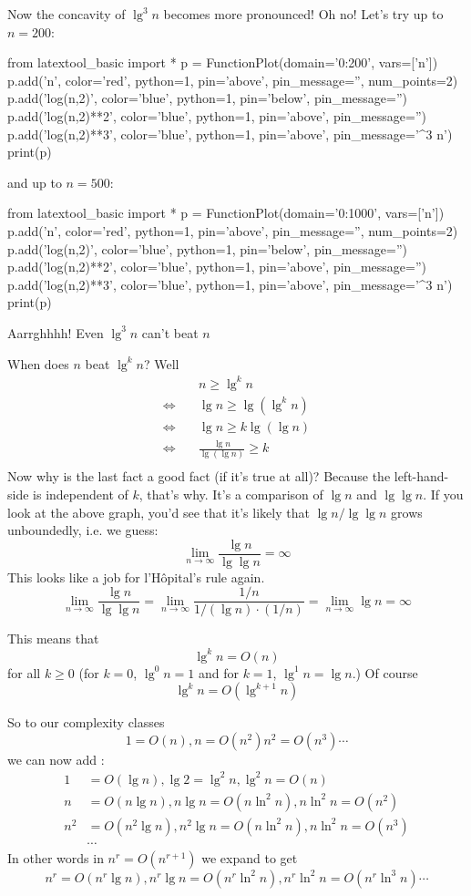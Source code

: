 Now the concavity of $\lg^3 n$ becomes more pronounced!
Oh no!
Let's try up to $n = 200$:
\begin{python}
from latextool_basic import *
p = FunctionPlot(domain='0:200', vars=['n'])
p.add('n', color='red', python=1, pin='above', pin_message='', num_points=2)
p.add('log(n,2)', color='blue', python=1, pin='below', pin_message='')
p.add('log(n,2)**2', color='blue', python=1, pin='above', pin_message='')
p.add('log(n,2)**3', color='blue', python=1, pin='above', pin_message='\lg^3 n')
print(p)
\end{python}
and up to $n = 500$:
\begin{python}
from latextool_basic import *
p = FunctionPlot(domain='0:1000', vars=['n'])
p.add('n', color='red', python=1, pin='above', pin_message='', num_points=2)
p.add('log(n,2)', color='blue', python=1, pin='below', pin_message='')
p.add('log(n,2)**2', color='blue', python=1, pin='above', pin_message='')
p.add('log(n,2)**3', color='blue', python=1, pin='above', pin_message='\lg^3 n')
print(p)
\end{python}
Aarrghhhh! Even $\lg^3 n$ can't beat $n$

When does $n$ beat $\lg^k n$?
Well
\begin{align*}
                 & n \geq \lg^k n \\
\iff \,\,\,\,\,\,& \lg n \geq \lg(\lg^k n) \\
\iff \,\,\,\,\,\,& \lg n \geq k \lg(\lg n) \\
\iff \,\,\,\,\,\,& \frac{\lg n}{\lg(\lg n)} \geq k \\
\end{align*}
Now why is the last fact a good fact (if it's true at all)?
Because the left-hand-side is independent of $k$, that's why.
It's a comparison of $\lg n$ and $\lg\lg n$.
If you look at the above graph, you'd see that it's likely that 
$\lg n/\lg\lg n$ grows unboundedly, i.e. we guess:
\[
\lim_{n \rightarrow \infty} \frac{\lg n}{\lg \lg n} = \infty
\]
This looks like a job for l'H\^opital's rule again.
\[
\lim_{n \rightarrow \infty} \frac{\lg n}{\lg \lg n}
= \lim_{n \rightarrow \infty} \frac{1/n}{1/(\lg n) \cdot (1/n)}
= \lim_{n \rightarrow \infty} \lg n
= \infty
\]

This means that 
\[
\lg^k n = O(n)
\]
for all $k \geq 0$
(for $k = 0$, $\lg^0 n = 1$ and for $k = 1$, $\lg^1 n = \lg n$.)
Of course
\[
\lg^k n = O(\lg^{k+1} n)
\]

So to our complexity classes
\[
1 = O(n), 
n = O(n^2) 
n^2 = O(n^3) \cdots
\]
we can now add :
\begin{align*}
1 &= O(\lg n), \lg 2 = \lg^2 n, \lg^2 n = O(n) \\
n &= O(n\lg n), n \lg n = O(n\ln^2 n),  n\ln^2 n = O(n^2) \\
n^2 &= O(n^2\lg n), n^2 \lg n = O(n\ln^2 n),  n\ln^2 n = O(n^3) \\
&\cdots \end{align*}
In other words in $n^r =  O(n^{r+1})$ we expand to get
\[
n^r
= O(n^r\lg n),
n^r\lg n = O(n^r\ln^2 n),  
n^r\ln^2 n = O(n^r\ln^3 n)
\cdots 
\]







